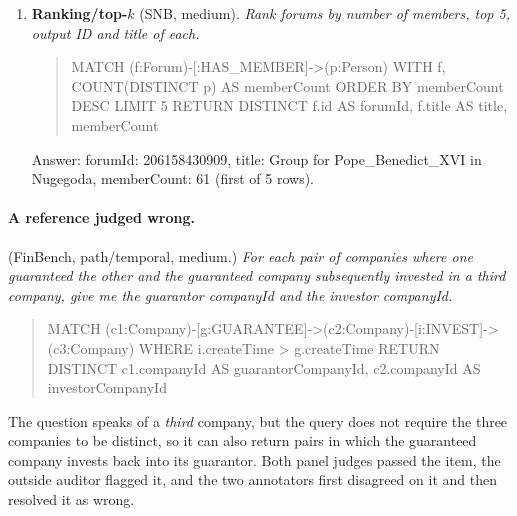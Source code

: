 \begin{enumerate}
\begin{quote}\scriptsize\ttfamily\raggedright\sloppy MATCH (a\allowbreak{}:Company)\allowbreak{}-[i\allowbreak{}:INVEST]\allowbreak{}-\textgreater{}(\allowbreak{}b\allowbreak{}:Company) WHERE a \textless{}\textgreater{} b AND i.createTime \textgreater{}= datetime('2018-01-01T00\allowbreak{}:00\allowbreak{}:00') AND i.createTime \textless{}= datetime('2020-12-31T23\allowbreak{}:59\allowbreak{}:59') AND NOT EXISTS \{ MATCH (b)\allowbreak{}-[\allowbreak{}:OWN\_ACCOUNT]\allowbreak{}-\textgreater{}(\allowbreak{}acc\allowbreak{}:Account) WHERE acc.isBlocked = true \} RETURN DISTINCT a.companyId, b.companyId\end{quote}
\noindent Answer: a.companyId: 506, b.companyId: 2199023256282 (first of 25 rows).
\item \textbf{Ranking/top-$k$} (SNB, medium). \emph{Rank forums by number of members, top 5, output ID and title of each.}
\begin{quote}\scriptsize\ttfamily\raggedright\sloppy MATCH (f\allowbreak{}:Forum)\allowbreak{}-[\allowbreak{}:HAS\_MEMBER]\allowbreak{}-\textgreater{}(\allowbreak{}p\allowbreak{}:Person) WITH f, COUNT(DISTINCT p) AS memberCount ORDER BY memberCount DESC LIMIT 5 RETURN DISTINCT f.id AS forumId, f.title AS title, memberCount\end{quote}
\noindent Answer: forumId: 206158430909, title: Group for Pope\_Benedict\_XVI in Nugegoda, memberCount: 61 (first of 5 rows).
\end{enumerate}

\paragraph{A reference judged wrong.} (FinBench, path/temporal, medium.) \emph{For each pair of companies where one guaranteed the other and the guaranteed company subsequently invested in a third company, give me the guarantor companyId and the investor companyId.}
\begin{quote}\scriptsize\ttfamily\raggedright\sloppy MATCH (c1\allowbreak{}:Company)\allowbreak{}-[g\allowbreak{}:GUARANTEE]\allowbreak{}-\textgreater{}(\allowbreak{}c2\allowbreak{}:Company)\allowbreak{}-[i\allowbreak{}:INVEST]\allowbreak{}-\textgreater{}(\allowbreak{}c3\allowbreak{}:Company) WHERE i.createTime \textgreater{} g.createTime RETURN DISTINCT c1.companyId AS guarantorCompanyId, c2.companyId AS investorCompanyId\end{quote}
\noindent The question speaks of a \emph{third} company, but the query does not require the three companies to be distinct, so it can also return pairs in which the guaranteed company invests back into its guarantor. Both panel judges passed the item, the outside auditor flagged it, and the two annotators first disagreed on it and then resolved it as wrong.
